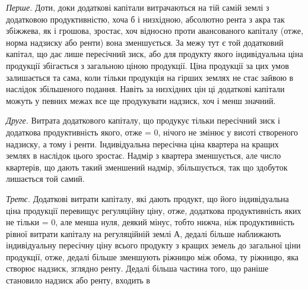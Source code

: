 \emph{Перше.} Доти, доки додаткові капітали витрачаються на тій самій землі
з додатковою продуктивністю, хоча б і низхідною, абсолютно рента з акра
так збіжжева, як і грошова, зростає, хоч відносно проти авансованого капіталу
(отже, норма надзиску або ренти) вона зменшується. За межу тут є той додатковий
капітал, що дає лише пересічний зиск, або для продукту якого індивідуальна
ціна продукції збігається з загальною ціною продукції. Ціна продукції
за цих умов залишається та сама, коли тільки продукція на гірших землях
не стає зайвою в наслідок збільшеного подання. Навіть за низхідних цін ці
додаткові капітали можуть у певних межах все ще продукувати надзиск, хоч
і менш значний.

\emph{Друге.} Витрата додаткового капіталу, що продукує тільки пересічний
зиск і додаткова продуктивність якого, отже = 0, нічого не змінює у висоті
створеного надзиску, а тому і ренти. Індивідуальна пересічна ціна квартера на
кращих землях в наслідок цього зростає. Надмір з квартера зменшується, але
число квартерів, що дають такий зменшений надмір, збільшується, так що здобуток
лишається той самий.

\emph{Третє.} Додаткові витрати капіталу, які дають продукт, що його індивідуальна
ціна продукції перевищує регуляційну ціну, отже, додаткова продуктивність
яких не тільки = 0, але менша нуля, деякий мінус, тобто нижча,
ніж продуктивність рівної витрати капіталу на регуляційній землі А, дедалі
більше наближають індивідуальну пересічну ціну всього продукту з кращих
земель до загальної ціни продукції, отже, дедалі більше зменшують ріжницю
між обома, ту ріжницю, яка створює надзиск, зглядно ренту. Дедалі
більша частина того, що раніше становило надзиск або ренту, входить в
\parbreak{}  %
